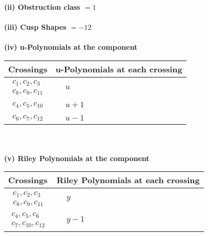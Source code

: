 \documentclass[1p]{elsarticle_modified}
\theoremstyle{definition}
\begin{document}
\flushleft \textbf{(ii) Obstruction class $= 1$}\\~\\
\flushleft \textbf{(iii) Cusp Shapes $= -12$}\\~\\
\newpage\renewcommand{\arraystretch}{1}
\flushleft \textbf{(iv) u-Polynomials at the component}\newline \\
\begin{tabular}{m{50pt}|m{274pt}}
Crossings & \hspace{64pt}u-Polynomials at each crossing \\
\hline $$\begin{aligned}c_{1},c_{2},c_{3}\\c_{8},c_{9},c_{11}\end{aligned}$$&$\begin{aligned}
&u
\end{aligned}$\\
\hline $$\begin{aligned}c_{4},c_{5},c_{10}\end{aligned}$$&$\begin{aligned}
&u+1
\end{aligned}$\\
\hline $$\begin{aligned}c_{6},c_{7},c_{12}\end{aligned}$$&$\begin{aligned}
&u-1
\end{aligned}$\\
\hline
\end{tabular}\\~\\
\newpage\renewcommand{\arraystretch}{1}
\flushleft \textbf{(v) Riley Polynomials at the component}\newline \\
\begin{tabular}{m{50pt}|m{274pt}}
Crossings & \hspace{64pt}Riley Polynomials at each crossing \\
\hline $$\begin{aligned}c_{1},c_{2},c_{3}\\c_{8},c_{9},c_{11}\end{aligned}$$&$\begin{aligned}
&y
\end{aligned}$\\
\hline $$\begin{aligned}c_{4},c_{5},c_{6}\\c_{7},c_{10},c_{12}\end{aligned}$$&$\begin{aligned}
&y-1
\end{aligned}$\\
\hline
\end{tabular}\\~\\
\end{document}
